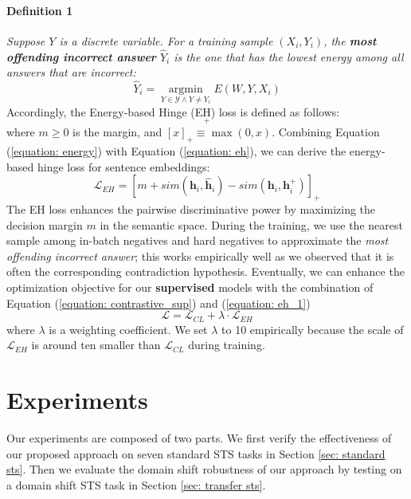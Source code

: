 \documentclass[11pt]{article}
\begin{document}
\paragraph{Definition 1} \textit{Suppose $Y$ is a discrete variable. For a training sample $(X_i, Y_i)$, the \textbf{most offending incorrect answer} $\hat{Y}_i$ is the one that has the lowest energy among all answers that are incorrect:}
\begin{equation}
\hat{Y}_i=\mathop{\arg\min}\limits_{Y\in\mathcal{Y} \land Y \neq Y_i}
E(W,Y,X_i)
\end{equation}
Accordingly, the Energy-based Hinge (EH) loss is defined as follows:
\begin{equation}
[m + E(W,Y_i,X_i) - E(W,\hat{Y}_i,X_i)]_{+}
\label{equation: eh}
\end{equation}
where $m \ge 0$ is the margin, and $[x]_{+}\equiv\max(0,x)$. Combining Equation (\ref{equation: energy}) with Equation (\ref{equation: eh}), we can derive the energy-based hinge loss for sentence embeddings:
\begin{equation}
\mathcal{L}_{EH}=
[m + sim(\textbf{h}_{i}, \hat{\textbf{h}}_{i}) - sim(\textbf{h}_{i}, \textbf{h}_{i}^+)]_{+}
\label{equation: eh_1}
\end{equation}
The EH loss enhances the pairwise discriminative power by maximizing the decision margin $m$ in the semantic space.
During the training, we use the nearest sample among in-batch negatives and hard negatives
to approximate the \textit{most offending incorrect answer}; this works empirically well as we observed that it is often the corresponding contradiction hypothesis. 
Eventually, we can enhance the optimization objective for our \textbf{supervised} models with the combination of Equation (\ref{equation: contrastive_sup}) and (\ref{equation: eh_1})
\begin{equation}
\mathcal{L}=\mathcal{L}_{CL} + \lambda \cdot \mathcal{L}_{EH}
\label{equation: total_loss}
\end{equation}
where $\lambda$ is a weighting coefficient. We set $\lambda$ to 10 empirically because the scale of $\mathcal{L}_{EH}$ is around ten smaller than $\mathcal{L}_{CL}$ during training.




\section{Experiments}
Our experiments are composed of two parts. We first verify the effectiveness of our proposed approach on seven standard STS tasks in Section \ref{sec: standard sts}. Then we evaluate the domain shift robustness of our approach by testing on a domain shift STS task in Section \ref{sec: transfer sts}. 
\end{document}
